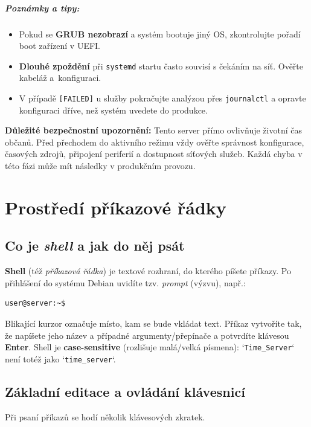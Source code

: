 \documentclass[11pt,a4paper]{book}
\begin{document}
\paragraph{Poznámky a tipy:}
\begin{itemize}
  \item Pokud se \textbf{GRUB nezobrazí} a systém bootuje jiný OS, zkontrolujte pořadí boot zařízení v UEFI.
  \item \textbf{Dlouhé zpoždění} při \texttt{systemd} startu často souvisí s čekáním na síť. Ověřte kabeláž a~konfiguraci.
  \item V případě \texttt{[FAILED]} u služby pokračujte analýzou přes \texttt{journalctl} a opravte konfiguraci dříve, než systém uvedete do produkce.
\end{itemize}

\medskip
\noindent
\textbf{Důležité bezpečnostní upozornění:} Tento server přímo ovlivňuje životní čas občanů. Před přechodem do aktivního režimu vždy ověřte správnost konfigurace, časových zdrojů, připojení periferií a dostupnost síťových služeb. Každá chyba v této fázi může mít následky v produkčním provozu.

\mainmatter
\chapter{Prostředí příkazové řádky}

\section{Co je \emph{shell} a jak do něj psát}
\noindent
\textbf{Shell} (též \emph{příkazová řádka}) je textové rozhraní, do kterého píšete příkazy. 
Po přihlášení do systému Debian uvidíte tzv. \emph{prompt} (výzvu), např.:
\begin{verbatim}
user@server:~$
\end{verbatim}
Blikající kurzor označuje místo, kam se bude vkládat text. Příkaz vytvoříte tak, že napíšete 
jeho název a případné argumenty/přepínače a potvrdíte klávesou \textbf{Enter}. Shell je 
\textbf{case-sensitive} (rozlišuje malá/velká písmena): `\texttt{Time\_Server}` není totéž jako `\texttt{time\_server}`.

\section{Základní editace a ovládání klávesnicí}
\noindent
Při psaní příkazů se hodí několik klávesových zkratek.
\end{document}
